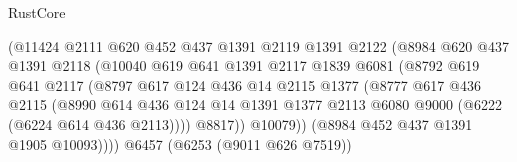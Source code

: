 \begin{lexlean}{RustCore}
\begin{coremodule}
                                    (@11424
                                      @2111
                                      @620
                                      @452
                                      @437
                                      @1391
                                      @2119
                                      @1391
                                      @2122
                                      (@8984
                                        @620
                                        @437
                                        @1391
                                        @2118
                                        (@10040
                                          @619
                                          @641
                                          @1391
                                          @2117
                                          @1839
                                          @6081
                                          (@8792
                                            @619
                                            @641
                                            @2117
                                            (@8797
                                              @617
                                              @124
                                              @436
                                              @14
                                              @2115
                                              @1377
                                              (@8777
                                                @617
                                                @436
                                                @2115
                                                (@8990
                                                  @614
                                                  @436
                                                  @124
                                                  @14
                                                  @1391
                                                  @1377
                                                  @2113
                                                  @6080
                                                  @9000
                                                  (@6222 (@6224 @614 @436 @2113))))
                                              @8817))
                                          @10079))
                                      (@8984 @452 @437 @1391 @1905 @10093))))
                                @6457
                                (@6253 (@9011 @626 @7519))

\end{coremodule}
\end{lexlean}
